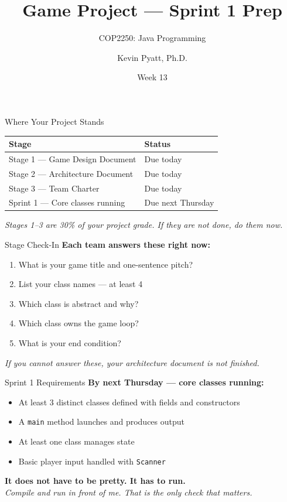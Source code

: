 \documentclass{beamer}
\title[Sprint 1 Prep]{Game Project --- Sprint 1 Prep}
\subtitle{COP2250: Java Programming}
\author{Kevin Pyatt, Ph.D.}
\institute{State College of Florida \\ Pyatt Labs}
\date{Week 13}
\begin{document}
\begin{frame}
  \titlepage
\end{frame}
\begin{frame}{Where Your Project Stands}
\begin{tabular}{ll}
\toprule
\textbf{Stage} & \textbf{Status} \\
\midrule
Stage 1 --- Game Design Document & Due today \\
Stage 2 --- Architecture Document & Due today \\
Stage 3 --- Team Charter & Due today \\
Sprint 1 --- Core classes running & Due next Thursday \\
\bottomrule
\end{tabular}
\vspace{0.3cm}
\textit{Stages 1--3 are 30\% of your project grade. If they are not done, do them now.}
\end{frame}
\begin{frame}{Stage Check-In}
\textbf{Each team answers these right now:}
\vspace{0.2cm}
\begin{enumerate}
  \item What is your game title and one-sentence pitch?
  \item List your class names --- at least 4
  \item Which class is abstract and why?
  \item Which class owns the game loop?
  \item What is your end condition?
\end{enumerate}
\vspace{0.3cm}
\textit{If you cannot answer these, your architecture document is not finished.}
\end{frame}
\begin{frame}{Sprint 1 Requirements}
\textbf{By next Thursday --- core classes running:}
\vspace{0.2cm}
\begin{itemize}
  \item At least 3 distinct classes defined with fields and constructors
  \item A \texttt{main} method launches and produces output
  \item At least one class manages state
  \item Basic player input handled with \texttt{Scanner}
\end{itemize}
\vspace{0.3cm}
\textbf{It does not have to be pretty. It has to run.}\\
\vspace{0.2cm}
\textit{Compile and run in front of me. That is the only check that matters.}
\end{frame}
\end{document}
